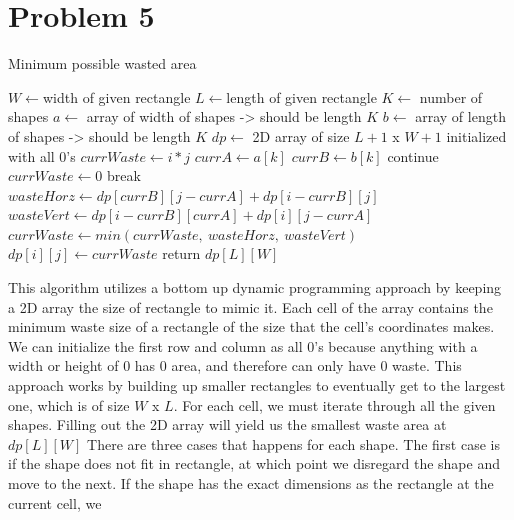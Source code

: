 \documentclass[12pt]{article}
\begin{document}
\newpage
\section*{Problem 5}
\vspace*{-1.5em}
\begin{algorithm}
\caption{Minimum possible wasted area}
\begin{algorithmic}[1]
\State $W \gets $width of given rectangle
\State $L \gets $length of given rectangle
\State $K \gets$ number of shapes
\State $a \gets $ array of width of shapes -> should be length $K$
\State $b \gets $ array of length of shapes -> should be length $K$
\State $dp \gets$ 2D array of size $L + 1$ x $W + 1$ initialized with all 0's
\State 
{}
        \State $currWaste \gets i * j$
            \State $currA \gets a[k]$
            \State $currB \gets b[k]$
            \State
                \State continue
            \EndIf
                \State $currWaste \gets 0$
                \State break
            \EndIf
            \State
            \State $wasteHorz \gets dp[currB][j - currA] + dp[i - currB][j]$
            \State $wasteVert \gets dp[i - currB][currA] + dp[i][j - currA]$
            \State $currWaste \gets min(currWaste,\ wasteHorz,\ wasteVert)$
        \EndFor
        \State $dp[i][j] \gets currWaste$
    \EndFor
\EndFor
\State return $dp[L][W]$
\end{algorithmic}
\end{algorithm}
\noindent
This algorithm utilizes a bottom up dynamic programming approach by keeping a 2D array the size of 
rectangle to mimic it. Each cell of the array contains the minimum waste size of a rectangle of the 
size that the cell's coordinates makes. We can initialize the first row and column as all 0's because 
anything with a width or height of 0 has 0 area, and therefore can only have 0 waste. This approach 
works by building up smaller rectangles to eventually get to the largest one, which is of size $W$ x $L$.
For each cell, we must iterate through all the given shapes. Filling out the 2D array will yield us the 
smallest waste area at $dp[L][W]$
\newline
\newline
There are three cases that happens for each 
shape. The first case is if the shape does not fit in rectangle, at which point we disregard the shape
and move to the next. If the shape has the exact dimensions as the rectangle at the current cell, we 
\end{document}

